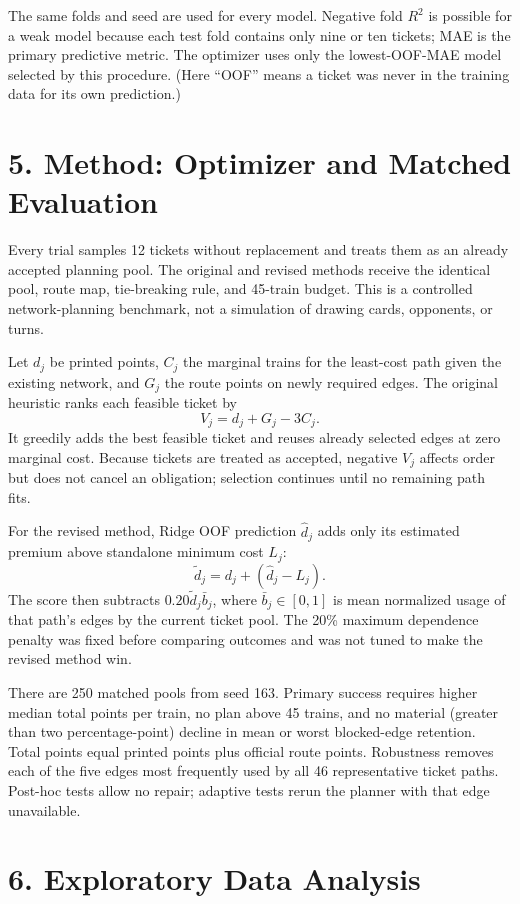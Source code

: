 \documentclass[11pt]{article}
\begin{document}
The same folds and seed are used for every model. Negative fold $R^2$ is
possible for a weak model because each test fold contains only nine or ten
tickets; MAE is the primary predictive metric. The optimizer uses only the
lowest-OOF-MAE model selected by this procedure. (Here ``OOF'' means a ticket
was never in the training data for its own prediction.)

\newpage
\section*{5. Method: Optimizer and Matched Evaluation}

Every trial samples 12 tickets without replacement and treats them as an
already accepted planning pool. The original and revised methods receive the
identical pool, route map, tie-breaking rule, and 45-train budget. This is a
controlled network-planning benchmark, not a simulation of drawing cards,
opponents, or turns.

Let $d_j$ be printed points, $C_j$ the marginal trains for the least-cost path
given the existing network, and $G_j$ the route points on newly required
edges. The original heuristic ranks each feasible ticket by
\[
V_j=d_j+G_j-3C_j.
\]
It greedily adds the best feasible ticket and reuses already selected edges
at zero marginal cost. Because tickets are treated as accepted, negative
$V_j$ affects order but does not cancel an obligation; selection continues
until no remaining path fits.

For the revised method, Ridge OOF prediction $\hat d_j$ adds only its
estimated premium above standalone minimum cost $L_j$:
\[
\widetilde d_j=d_j+(\hat d_j-L_j).
\]
The score then subtracts
$0.20\widetilde d_j\bar b_j$, where $\bar b_j\in[0,1]$ is mean normalized
usage of that path's edges by the current ticket pool. The 20\% maximum
dependence penalty was fixed before comparing outcomes and was not tuned to
make the revised method win.

There are 250 matched pools from seed 163. Primary success requires higher
median total points per train, no plan above 45 trains, and no material
(greater than two percentage-point) decline in mean or worst blocked-edge
retention. Total points equal printed points plus official route points.
Robustness removes each of the five edges most frequently used by all 46
representative ticket paths. Post-hoc tests allow no repair; adaptive tests
rerun the planner with that edge unavailable.

\newpage
\section*{6. Exploratory Data Analysis}
\end{document}
